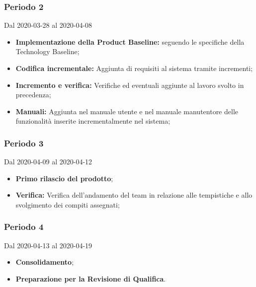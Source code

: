 \subsubsection{Periodo 2} 
Dal 2020-03-28 al 2020-04-08\\
\begin{itemize}
	\item \textbf{Implementazione della Product Baseline:} seguendo le specifiche della Technology Baseline;
	\item \textbf{Codifica incrementale:} Aggiunta di requisiti al sistema tramite incrementi;
	\item \textbf{Incremento e verifica:} Verifiche ed eventuali aggiunte al lavoro svolto in precedenza;
	\item \textbf{Manuali:} Aggiunta nel manuale utente e nel manuale manutentore delle funzionalità inserite incrementalmente nel sistema;
\end{itemize}
\subsubsection{Periodo 3}
Dal 2020-04-09 al 2020-04-12\\
\begin{itemize}
	\item \textbf{Primo rilascio del prodotto};
	\item \textbf{Verifica:} Verifica dell'andamento del team in relazione alle tempistiche e allo svolgimento dei compiti assegnati;
\end{itemize}
\subsubsection{Periodo 4} 
Dal 2020-04-13 al 2020-04-19\\
\begin{itemize}
	\item \textbf{Consolidamento};
	\item \textbf{Preparazione per la Revisione di Qualifica}.
\end{itemize}

